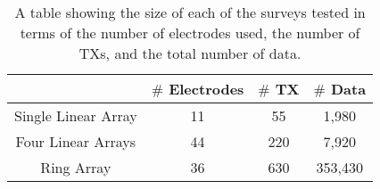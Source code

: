 \documentclass[preprint,authoryear,12pt]{elsarticle}
\begin{document}
\begin{table} [htp]
   \footnotesize
    \begin{center}
        \begin{tabular}{| c | c | c | c |}
            \hline
             & \textbf{\mbox{\boldmath$\#$} Electrodes} & \textbf{\mbox{\boldmath$\#$} TX} & \textbf{\mbox{\boldmath$\#$} Data}\\
            \hline
            Single Linear Array & 11 & 55 & 1,980 \\
            \hline
            Four Linear Arrays & 44 & 220 & 7,920 \\
            \hline
            Ring Array & 36 & 630 & 353,430 \\
            \hline
        \end{tabular}
    \end{center}
\caption{A table showing the size of each of the surveys tested in terms of the number of electrodes used, the number of TXs, and the total number of data.}
\label{table:SurveyDesign_FullSurveyStats}
\end{table}
\end{document}
